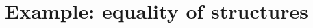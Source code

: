 \documentclass[hott-all.tex]{subfiles}
\begin{document}
%
%
%

\section{Example: equality of structures}
\label{sec:equality-of-structures}
\end{document}

